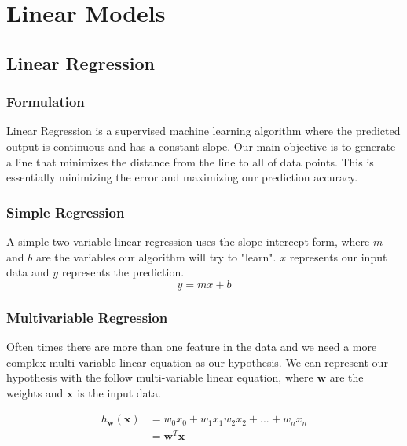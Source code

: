 \documentclass[12pt]{article}
\begin{document}
        
\section{Linear Models}
    \subsection{Linear Regression}
    \subsubsection{Formulation}
        Linear Regression is a supervised machine learning algorithm where the predicted output is continuous and has a constant slope. Our main objective is to generate a line that
        minimizes the distance from the line to all of data points. This is essentially minimizing the error and maximizing our prediction accuracy.
    
    \subsubsection{Simple Regression}
        A simple two variable linear regression uses the slope-intercept form, where $m$ and $b$ are the variables our algorithm will try to "learn". $x$ represents our input data
        and $y$ represents the prediction.
        $$ y = mx + b$$

    \subsubsection{Multivariable Regression}
        Often times there are more than one feature in the data and we need a more complex multi-variable linear equation as our hypothesis. We can represent our hypothesis with the
        follow multi-variable linear equation, where $\boldsymbol{w}$ are the weights and $\boldsymbol{x}$ is the input data.

        \begin{align*}
            h_{\boldsymbol{w}}(\boldsymbol{x}) &= w_0x_0 + w_1x_1 w_2x_2 + ... + w_nx_n \\
            &= \boldsymbol{w}^T\boldsymbol{x}
        \end{align*}
\end{document}
